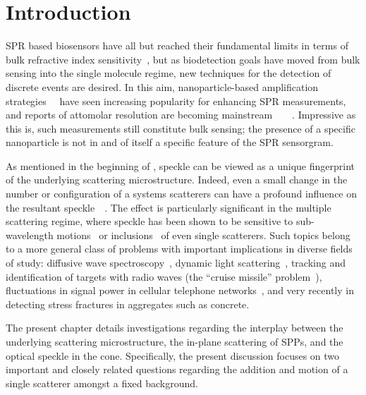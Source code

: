 \section{Introduction}
SPR based biosensors have all but reached their fundamental limits in terms of
bulk refractive index sensitivity~\cite{piliarik2009surface}, but as
biodetection goals have moved from bulk sensing into the single molecule
regime, new techniques for the detection of discrete events are desired.  In
this aim, nanoparticle-based amplification
strategies~\cite{wang2005nanomaterial}~\cite{jain2007review} have seen
increasing popularity for enhancing SPR measurements, and reports of attomolar
resolution are becoming
mainstream~\cite{fang2006attomole}~\cite{krishnan2011attomolar}~\cite{kwon2012nanoparticle}~\cite{sim2010attomolar}.
Impressive as this is, such measurements still constitute bulk sensing; the
presence of a specific nanoparticle is not in and of itself a specific feature
of the SPR sensorgram.

As mentioned in the beginning of , speckle can be viewed as
a unique fingerprint~\cite{ravikanth2001physical} of the underlying scattering
microstructure.  Indeed, even a small change in the number or configuration of
a systems scatterers can have a profound influence on the resultant
speckle~\cite{berkovits1994correlations}~\cite{feng1986sensitivity}.  The
effect is particularly significant in the multiple scattering regime, where
speckle has been shown to be sensitive to sub-wavelength
motions~\cite{berkovits1991sensitivity} or
inclusions~\cite{berkovits1990theory} of even single scatterers.  Such topics
belong to a more general class of problems with important implications in
diverse fields of study: diffusive wave spectroscopy~\cite{pine1988diffusing},
dynamic light scattering~\cite{berne2000dynamic}, tracking and identification
of targets with radio waves (the ``cruise missile''
problem~\cite{atkins1991neural}), fluctuations in signal power in cellular
telephone networks~\cite{abdi2001estimation}, and very recently in detecting
stress fractures in aggregates such as concrete.

The present chapter details investigations regarding the interplay between the
underlying scattering microstructure, the in-plane scattering of SPPs, and the
optical speckle in the cone.  Specifically, the present discussion focuses on
two important and closely related questions regarding the addition and motion
of a single scatterer amongst a fixed background.
